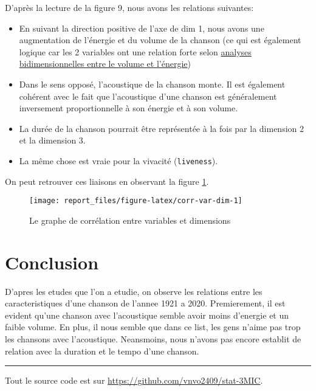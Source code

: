 \documentclass[
  11pt,
  xcolor = usenames,dvipsnames]{article}
\newcommand{\passthrough}[1]{#1}
\providecommand{\tightlist}{%
  \setlength{\itemsep}{0pt}\setlength{\parskip}{0pt}}
\begin{document}
D'après la lecture de la figure 9, nous avons les relations suivantes:

\begin{itemize}
\tightlist
\item
  En suivant la direction positive de l'axe de dim 1, nous avons une augmentation de l'énergie et du volume de la chanson (ce qui est également logique car les 2 variables ont une relation forte selon \protect\hyperlink{volume-energy}{analyses bidimensionnelles entre le volume et l'énergie})
\item
  Dans le sens opposé, l'acoustique de la chanson monte. Il est également cohérent avec le fait que l'acoustique d'une chanson est généralement inversement proportionnelle à son énergie et à son volume.
\item
  La durée de la chanson pourrait être représentée à la fois par la dimension 2 et la dimension 3.
\item
  La même chose est vraie pour la vivacité (\passthrough{\lstinline!liveness!}).
\end{itemize}

On peut retrouver ces liaisons en observant la figure \ref{fig:corr-var-dim}.

\begin{figure}

{\centering \texttt{[image: report\_files/figure-latex/corr-var-dim-1]} 

}

\caption{Le graphe de corrélation entre variables et dimensions}\label{fig:corr-var-dim}
\end{figure}

\hypertarget{conclusion}{%
\section{Conclusion}\label{conclusion}}

D'apres les etudes que l'on a etudie, on observe les relations entre les caracteristiques d'une chanson de l'annee 1921 a 2020.
Premierement, il est evident qu'une chanson avec l'acoustique semble avoir moins d'energie et un faible volume.
En plus, il nous semble que dans ce list, les gens n'aime pas trop les chansons avec l'acoustique.
Neansmoins, nous n'avons pas encore establit de relation avec la duration et le tempo d'une chanson.

\begin{center}\rule{0.5\linewidth}{0.5pt}\end{center}

Tout le source code est sur \url{https://github.com/vnvo2409/stat-3MIC}.
\end{document}
